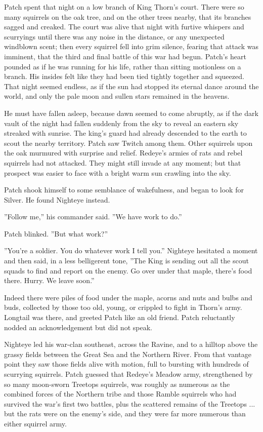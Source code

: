 \documentclass[12pt]{book}
\begin{document}
 Patch spent that night on a low branch of King Thorn's court. There were so many squirrels on the oak tree, and on the other trees nearby, that its branches sagged and creaked. The court was alive that night with furtive whispers and scurryings %
 until there was any noise in the distance, or any unexpected windblown scent; then every squirrel fell into grim silence, fearing that attack was imminent, that the third and final battle of this war had begun. Patch's heart pounded as if he was running for his life, rather than sitting motionless on a branch. His insides felt like they had been tied tightly together and squeezed. That night seemed endless, as if the sun had stopped its eternal dance around the world, and only the pale moon and sullen stars remained in the heavens.\par
 He must have fallen asleep, because dawn seemed to come abruptly, as if the dark vault of the night had fallen suddenly from the sky to reveal an eastern sky streaked with sunrise. The king's guard had already descended to the earth to scout the nearby territory. Patch saw Twitch among them. Other squirrels upon the oak murmured with surprise and relief. Redeye's armies of rats and rebel squirrels had not attacked. They might still invade at any moment; but that prospect was easier to face with a bright warm sun crawling into the sky.\par
 Patch shook himself to some semblance of wakefulness, and began to look for Silver. He found Nighteye instead.\par
 ''Follow me,'' his commander said. ''We have work to do.''\par
 Patch blinked. ''But %
 what work?''\par
 ''You're a soldier. You do whatever work I tell you.'' Nighteye hesitated a moment and then said, in a less belligerent tone, ''The King is sending out all the scout squads to find and report on the enemy. Go over under that maple, there's food there. Hurry. We leave soon.''\par
 Indeed there were piles of food under the maple, acorns and nuts and bulbs and buds, collected by those too old, young, or crippled to fight in Thorn's army. Longtail was there, and greeted Patch like an old friend. Patch reluctantly nodded an acknowledgement but did not speak.\par
 Nighteye led his war-clan southeast, across the Ravine, and to a hilltop above the grassy fields between the Great Sea and the Northern River. From that vantage point they saw those fields alive with motion, full to bursting with hundreds of scurrying squirrels. Patch guessed that Redeye's Meadow army, strengthened by so many moon-sworn Treetops squirrels, was roughly as numerous as the combined forces of the Northern tribe and those Ramble squirrels who had survived the war's first two battles, plus the scattered remains of the Treetops ... but the rats were on the enemy's side, and they were far more numerous than either squirrel army.\par
\end{document}
